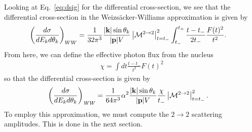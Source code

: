 Looking at Eq.~\ref{eq:dsig} for the differential cross-section, we see that the differential cross-section in the Weizs\"acker-Williams approximation is given by
\begin{align}
    \left(\frac{d\sigma}{dE_kd\theta_k}\right)_{WW} &= \frac{1}{32\pi^3} \frac{|{\bf k}|\sin{\theta_k}}{|{\bf p}|V}\left|{\cal M}^{2\rightarrow 2}\right|^2_{t = t_-}\int_{t_-}^{t_+}\frac{t-t_{-}}{2t_-}\frac{F(t)^2}{t^2}.
\end{align}
From here, we can define the effective photon flux from the nucleus
\begin{align}
    \chi = \int{dt\frac{t-t_{-}}{{t^2}}F(t)^2}
\end{align}
so that the differential cross-section is given by 
\begin{align}
    \left(\frac{d\sigma}{dE_kd\theta_k}\right)_{\it WW} &= \frac{1}{64\pi^3} \alpha^2\frac{|{\bf k}|\sin{\theta_k}}{|{\bf p}|V}\frac{\chi}{t_-}\left|{\cal M}^{2\rightarrow 2}\right|^2_{t = t_-}.
\end{align}
To employ this approximation, we must compute the $2\rightarrow 2$ scattering amplitudes. This is done in the next section. 

